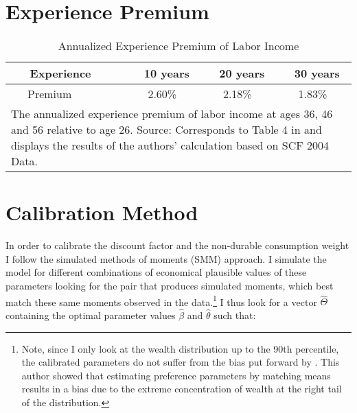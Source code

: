 \documentclass[a4paper,12pt,legno]{article}
\begin{document}
\newpage








\newpage{}
\appendix
\section{Experience Premium}
 \label{table_experience_premium}  


\begin{table}[!htbp]
\centering

\caption{Annualized Experience Premium of Labor Income}
\label{my-label}
\begin{tabular}{@{}llll@{}}
\toprule
 \ \ \ Experience \ \ & \ \ 10 years & \ \ 20 years & \ \ 30 years  \\ \midrule
  \ \ \ Premium \ \ & \ \ \ 2.60\%  & \ \ \ 2.18\%  & \ \ \ 1.83\% \\
\bottomrule
\multicolumn{4}{l}{%
  \begin{minipage}{9.5cm}%
\small The annualized experience premium of labor income at ages 36, 46 and 56 relative to age 26. Source: Corresponds to Table 4 in \cite{hintermaier2011} and displays the results of the authors' calculation based on SCF 2004 Data.
  \end{minipage}%
}\\
\end{tabular}
\end{table}

\section{Calibration Method}
\label{estimation_procedure}
In order to calibrate the discount factor and the non-durable consumption weight I follow the simulated methods of moments (SMM) approach. I simulate the model for different combinations of economical plausible values of these parameters looking for the pair that produces simulated moments, which best match these same moments observed in the data.\footnote{Note, since I only look at the wealth distribution up to the 90th percentile, the calibrated parameters do not suffer from the bias put forward by \cite{cagetti2003}. This author showed that estimating preference parameters by matching means results in a bias due to the extreme concentration of wealth at the right tail of the distribution.} I thus look for a vector $\hat{\Theta}$ containing the optimal parameter values $\hat{\beta}$ and $\hat{\theta}$ such that: 
\end{document}

